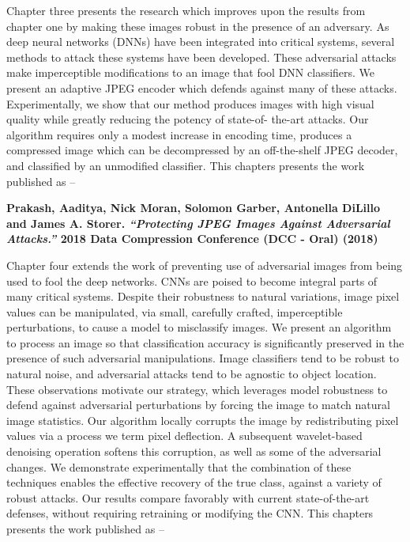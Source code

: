 Chapter three presents the research which improves upon the results from chapter one by making these images robust in the presence of an adversary.
As deep neural networks (DNNs) have been integrated into critical systems, several methods to attack these systems have been developed. These adversarial attacks make imperceptible modifications to an image that fool DNN classifiers. We present an adaptive JPEG encoder which defends against many of these attacks. Experimentally, we show that our method produces images with high visual quality while greatly reducing the potency of state-of- the-art attacks. Our algorithm requires only a modest increase in encoding time, produces a compressed image which can be decompressed by an off-the-shelf JPEG decoder, and classified by an unmodified classifier.
This chapters presents the work published as --

\noindent\textbf{
Prakash, Aaditya, Nick Moran, Solomon Garber, Antonella DiLillo and James A. Storer. \textit{``Protecting JPEG Images Against Adversarial Attacks.''} 2018 Data Compression Conference (DCC - Oral) (2018)
}
\vspace{2em}

Chapter four extends the work of preventing use of adversarial images from being used to fool the deep networks.
CNNs are poised to become integral parts of many critical systems. Despite their robustness to natural variations, image pixel values can be manipulated, via small, carefully crafted, imperceptible perturbations, to cause a model to misclassify images. We present an algorithm to process an image so that classification accuracy is significantly preserved in the presence of such adversarial manipulations. Image classifiers tend to be robust to natural noise, and adversarial attacks tend to be agnostic to object location. These observations motivate our strategy, which leverages model robustness to defend against adversarial perturbations by forcing the image to match natural image statistics. Our algorithm locally corrupts the image by redistributing pixel values via a process we term pixel deflection. A subsequent wavelet-based denoising operation softens this corruption, as well as some of the adversarial changes. We demonstrate experimentally that the combination of these techniques enables the effective recovery of the true class, against a variety of robust attacks. Our results compare favorably with current state-of-the-art defenses, without requiring retraining or modifying the CNN.
This chapters presents the work published as --

